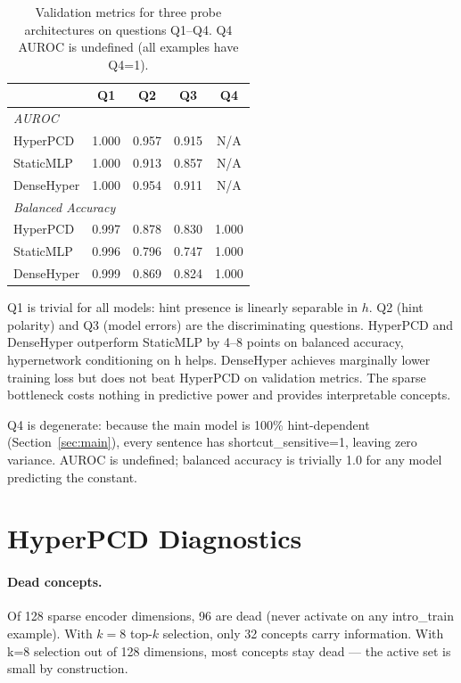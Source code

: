 \documentclass{article}
\begin{document}
\begin{table}[h]
\centering
\small
\begin{tabular}{lcccc}
\toprule
 & \textbf{Q1} & \textbf{Q2} & \textbf{Q3} & \textbf{Q4} \\
\midrule
\multicolumn{5}{l}{\textit{AUROC}} \\
HyperPCD & 1.000 & 0.957 & 0.915 & N/A \\
StaticMLP & 1.000 & 0.913 & 0.857 & N/A \\
DenseHyper & 1.000 & 0.954 & 0.911 & N/A \\
\midrule
\multicolumn{5}{l}{\textit{Balanced Accuracy}} \\
HyperPCD & 0.997 & 0.878 & 0.830 & 1.000 \\
StaticMLP & 0.996 & 0.796 & 0.747 & 1.000 \\
DenseHyper & 0.999 & 0.869 & 0.824 & 1.000 \\
\bottomrule
\end{tabular}
\caption{Validation metrics for three probe architectures on questions Q1--Q4. Q4 AUROC is undefined (all examples have Q4=1).}
\label{tab:probes}
\end{table}

Q1 is trivial for all models: hint presence is linearly separable in $h$. Q2 (hint polarity) and Q3 (model errors) are the discriminating questions. HyperPCD and DenseHyper outperform StaticMLP by 4--8 points on balanced accuracy, hypernetwork conditioning on h helps. DenseHyper achieves marginally lower training loss but does not beat HyperPCD on validation metrics. The sparse bottleneck costs nothing in predictive power and provides interpretable concepts.

Q4 is degenerate: because the main model is 100\% hint-dependent (Section~\ref{sec:main}), every sentence has shortcut\_sensitive=1, leaving zero variance. AUROC is undefined; balanced accuracy is trivially 1.0 for any model predicting the constant.

\section{HyperPCD Diagnostics}
\label{sec:diagnostics}

\paragraph{Dead concepts.} Of 128 sparse encoder dimensions, 96 are dead (never activate on any intro\_train example). With $k\!=\!8$ top-$k$ selection, only 32 concepts carry information. With k=8 selection out of 128 dimensions, most concepts stay dead — the active set is small by construction.
\end{document}
